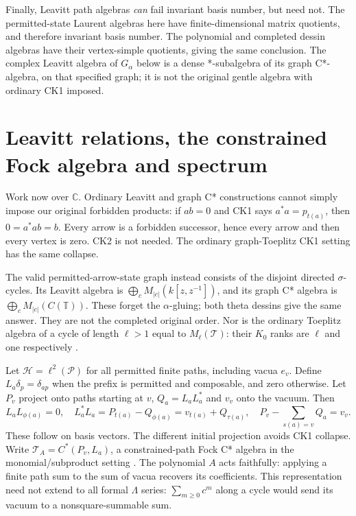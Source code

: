 \documentclass[11pt,oneside,openany]{book}
\theoremstyle{definition}\newtheorem{definition}[theorem]{Definition}
\theoremstyle{remark}\newtheorem{remark}[theorem]{Remark}
\newcommand{\C}{\mathbb C}\newcommand{\Z}{\mathbb Z}\newcommand{\R}{\mathbb R}
\begin{document}
Finally, Leavitt path algebras \emph{can} fail invariant basis number, but need not. The permitted-state Laurent algebras here have finite-dimensional matrix quotients, and therefore invariant basis number. The polynomial and completed dessin algebras have their vertex-simple quotients, giving the same conclusion. The complex Leavitt algebra of $G_\alpha$ below is a dense *-subalgebra of its graph C*-algebra, on that specified graph; it is not the original gentle algebra with ordinary CK1 imposed.



\chapter{Leavitt relations, the constrained Fock algebra and spectrum}
Work now over $\C$. Ordinary Leavitt and graph C* constructions \cite{AbramsArandaPino,BPRS} cannot simply impose our original forbidden products: if $ab=0$ and CK1 says $a^*a=p_{t(a)}$, then $0=a^*ab=b$. Every arrow is a forbidden successor, hence every arrow and then every vertex is zero. CK2 is not needed. The ordinary graph-Toeplitz CK1 setting has the same collapse.

The valid permitted-arrow-state graph instead consists of the disjoint directed $\sigma$-cycles. Its Leavitt algebra is $\bigoplus_cM_{|c|}(k[z,z^{-1}])$, and its graph C* algebra is $\bigoplus_cM_{|c|}(C(\mathbb T))$. These forget the $\alpha$-gluing; both theta dessins give the same answer. They are not the completed original order. Nor is the ordinary Toeplitz algebra of a cycle of length $\ell>1$ equal to $M_\ell(\mathcal T)$: their $K_0$ ranks are $\ell$ and one respectively \cite{BrownloweLacaRobertsonSims}.

Let $\mathcal H=\ell^2(\mathcal P)$ for all permitted finite paths, including vacua $e_v$. Define $L_a\delta_p=\delta_{ap}$ when the prefix is permitted and composable, and zero otherwise. Let $P_v$ project onto paths starting at $v$, $Q_a=L_aL_a^*$ and $v_v$ onto the vacuum. Then
\[
 L_aL_{\phi(a)}=0,\quad
 L_a^*L_a=P_{t(a)}-Q_{\phi(a)}=v_{t(a)}+Q_{\tau(a)},\quad
 P_v-\sum_{s(a)=v}Q_a=v_v.
\]
These follow on basis vectors. The different initial projection avoids CK1 collapse. Write $\mathcal T_A=C^*(P_v,L_a)$, a constrained-path Fock C* algebra in the monomial/subproduct setting \cite{KakariadisShalit,ShalitSolel}. The polynomial $A$ acts faithfully: applying a finite path sum to the sum of vacua recovers its coefficients. This representation need not extend to all formal $\Lambda$ series: $\sum_{m\ge0}c^m$ along a cycle would send its vacuum to a nonsquare-summable sum.
\end{document}
